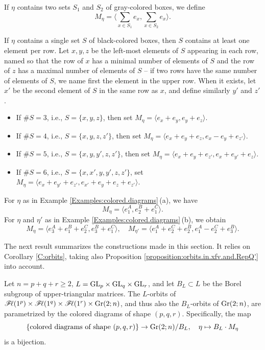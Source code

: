 \documentclass[12pt,reqno]{amsart}
\begin{document}
If $\eta$ contains two sets $S_1$ and $S_2$ of gray-colored boxes, we define
$$
M_\eta=\langle \sum_{x\in S_1}e_x,\sum_{x\in S_2}e_x\rangle.
$$

If $\eta$ contains a single set $S$ of black-colored boxes, then $S$ contains at least one element per row. Let $x,y,z$ be the left-most elements of $S$ appearing in each row, named so that the row of $x$ has a minimal number of elements of $S$ and the row of $z$ has a maximal number of elements of $S$ -- if two rows have the same number of elements of $S$, we name first the element in the upper row. When it exists, let $x'$ be the second element of $S$ in the same row as $x$, and define similarly $y'$ and $z'$.
\begin{itemize}
    \item If $\#S=3$, i.e., $S=\{x,y,z\}$, then set
    $M_\eta=\langle e_{x}+e_{y},e_{y}+e_{z}\rangle$.
    \item If $\#S=4$, i.e., $S=\{x,y,z,z'\}$, then set
    $M_\eta=\langle e_{x}+e_{y}+e_{z},e_{x}-e_{y}+e_{z'}\rangle$.
    \item If $\#S=5$, i.e., $S=\{x,y,y',z,z'\}$, then set
    $M_\eta=\langle e_{x}+e_{y}+e_{z'},e_{x}+e_{y'}+e_{z}\rangle$.
    \item If $\#S=6$, i.e., $S=\{x,x',y,y',z,z'\}$, set
    $M_\eta=\langle e_{x}+e_{y'}+e_{z'},e_{x'}+e_{y}+e_{z}+e_{z'}\rangle$.
\end{itemize}

\begin{example}
For $\eta$ as in Example \ref{Examples:colored.diagrams}\,(a), we have
$$
M_\eta=\langle e_1^A,e_2^B+e_1^C \rangle.
$$
For $\eta$ and $\eta'$ as in Example \ref{Examples:colored.diagrams}\,(b), we obtain
$$
M_\eta=\langle e_3^A+e_1^B+e_2^C,e_3^B+e_1^C\rangle,\quad
M_{\eta'}=\langle e_1^A+e_2^C+e_2^B,e_1^A-e_2^C+e_3^B\rangle.
$$
\end{example}

The next result summarizes the constructions made in this section.
It relies on Corollary \ref{C:orbits}, taking also Proposition \ref{proposition:orbits.in.xfv.and.RepQ'} into account.

\begin{theorem}
Let $n=p+q+r\geq 2$, $L=\mathrm{GL}_p\times\mathrm{GL}_q\times\mathrm{GL}_r$, and let $B_L\subset L$ be the Borel subgroup of upper-triangular matrices.
The $L$-orbits of $\mathscr{F}\!\ell(1^p)\times\mathscr{F}\!\ell(1^q)\times\mathscr{F}\!\ell(1^r)\times\mathrm{Gr}(2;n)$, and thus also the $B_L$-orbits of $\mathrm{Gr}(2;n)$,
are parametrized by the colored diagrams of shape $(p,q,r)$.
Specifically, the map
$$
\{\text{\rm colored diagrams of shape $(p,q,r)$}\}\to \mathrm{Gr}(2;n)/B_L,\quad \eta\mapsto B_L\cdot M_\eta
$$
is a bijection.
\end{theorem}


\printbibliography
\end{document}
